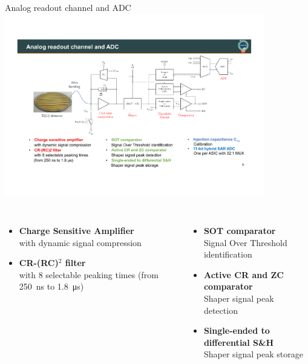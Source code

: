 \documentclass[aspectratio=169,xcolor=dvipsnamesz]{beamer} %
\begin{document}

\begin{frame}{Analog readout channel and ADC}
    \fontsize{8.5pt}{1}\selectfont
    \addtolength{\leftmargini}{\labelsep}
    \centering
    \includegraphics[width=0.85\textwidth]{images/backup_slides/schematico_detector.pdf}
    \vskip0.3cm
    \begin{columns}[T]
            \begin{itemize}
                \item \textbf{Charge Sensitive Amplifier}\\ with dynamic signal compression
                \item \textbf{CR-(RC)$^{2}$ filter}\\ with 8 selectable peaking times (from \SI{250}{\nano\second} to \SI{1.8}{\micro\second})
            \end{itemize}
            
            \begin{itemize}
                \item \textbf{SOT comparator}\\ Signal Over Threshold identification
                \item \textbf{Active CR and ZC comparator}\\ Shaper signal peak detection
                \item \textbf{Single-ended to differential S\&H}\\ Shaper signal peak storage
            \end{itemize}
        

\end{columns}
\end{frame}
\end{document}
